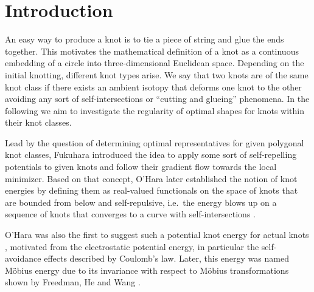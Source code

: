 \section{Introduction}

An easy way to produce a knot is to tie a piece of string and glue the ends together. This motivates the mathematical definition of a knot as a continuous embedding of a circle into three-dimensional Euclidean space. Depending on the initial knotting, different knot types arise. We say that two knots are of the same knot class if there exists an ambient isotopy \cite[p.~4f.]{Cromwell:2004} that deforms one knot to the other avoiding any sort of self-intersections or ``cutting and glueing'' phenomena. 
In the following we aim to investigate the regularity of optimal shapes for knots within their knot classes. 

Lead by the question of determining optimal representatives for given polygonal knot classes, Fukuhara \cite{Fukuhara:1988:EnergyKnot} introduced the idea to apply some sort of self-repelling potentials to given knots and follow their gradient flow towards the local minimizer. Based on that concept, O'Hara later established the notion of knot energies by defining them as real-valued functionals on the space of knots that are bounded from below and self-repulsive, i.e.~the energy blows up on a sequence of knots that converges to a curve with self-intersections \cite{OHara:2003:EnergyKnotsConformGeom}.

O'Hara was also the first to suggest such a potential knot energy for actual knots \cite{OHara:1991:EnergyKnot}, motivated from the electrostatic potential energy, in particular the self-avoidance effects described by Coulomb's law. Later, this energy was named Möbius energy due to its invariance with respect to Möbius transformations shown by Freedman, He and Wang \cite{Freedmanetal:1994:MoebiusEnergy}. 

